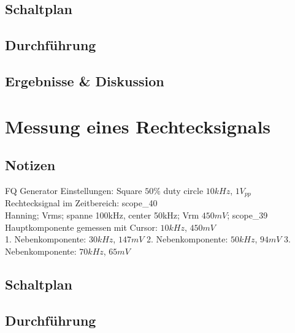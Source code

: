 \documentclass[12pt,a4paper,titlepage]{article}
\begin{document}
\subsection*{Schaltplan}

\subsection*{Durchf\"uhrung}

\subsection*{Ergebnisse \& Diskussion}




\section{Messung eines Rechtecksignals}

\subsection*{Notizen}
FQ Generator Einstellungen: Square $50\%$ duty circle $10kHz$, $1V_{pp}$ \\
Rechtecksignal im Zeitbereich: scope_40 \\
Hanning; Vrms; spanne 100kHz, center 50kHz; Vrm $450mV$; scope_39 \\
Hauptkomponente gemessen mit Cursor: $10kHz$, $450mV$ \\
1. Nebenkomponente: $30kHz$, $147mV$
2. Nebenkomponente: $50kHz$, $94mV$
3. Nebenkomponente: $70kHz$, $65mV$



\subsection*{Schaltplan}

\subsection*{Durchf\"uhrung}
\end{document}
